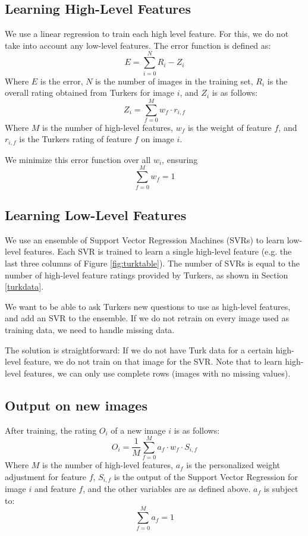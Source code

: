 \documentclass[11pt,letter]{article}
\begin{document}
\subsection{Learning High-Level Features}
We use a linear regression to train each high level feature. For this, we do not take into account any low-level features. The error function is defined as:
\[
E=\displaystyle\sum\limits_{i=0}^N R_i-Z_i
\]
Where $E$ is the error, $N$ is the number of images in the training set, $R_i$ is the overall rating obtained from Turkers for image $i$, and $Z_i$ is as follows:
\[
Z_i=\displaystyle\sum\limits_{f=0}^M w_f \cdot r_{i,f}
\]
Where $M$ is the number of high-level features, $w_f$ is the weight of feature $f$, and $r_{i,f}$ is the Turkers rating of feature $f$ on image $i$.

We minimize this error function over all $w_i$, ensuring
\[
\displaystyle\sum\limits_{f=0}^M w_f = 1
\]


\subsection{Learning Low-Level Features}
\label{llfeat}
We use an ensemble of Support Vector Regression Machines (SVRs) to learn low-level features. Each SVR is trained to learn a single high-level feature (e.g. the last three columns of Figure \ref{fig:turktable}). The number of SVRs is equal to the number of high-level feature ratings provided by Turkers, as shown in Section \ref{turkdata}.

We want to be able to ask Turkers new questions to use as high-level features, and add an SVR to the ensemble. If we do not retrain on every image used as training data, we need to handle missing data.

The solution is straightforward: If we do not have Turk data for a certain high-level feature, we do not train on that image for the SVR. Note that to learn high-level features, we can only use complete rows (images with no missing values).

\subsection{Output on new images}
After training, the rating $O_i$ of a new image $i$ is as follows:
\[
O_i=\frac{1}{M}\displaystyle\sum\limits_{f=0}^Ma_f \cdot w_f \cdot S_{i,f}
\]
Where $M$ is the number of high-level features, $a_f$ is the personalized weight adjustment for feature $f$, $S_{i,f}$ is the output of the Support Vector Regression for image $i$ and feature $f$, and the other variables are as defined above. $a_f$ is subject to:
\[
\displaystyle\sum\limits_{f=0}^M a_f = 1
\]
\end{document}
